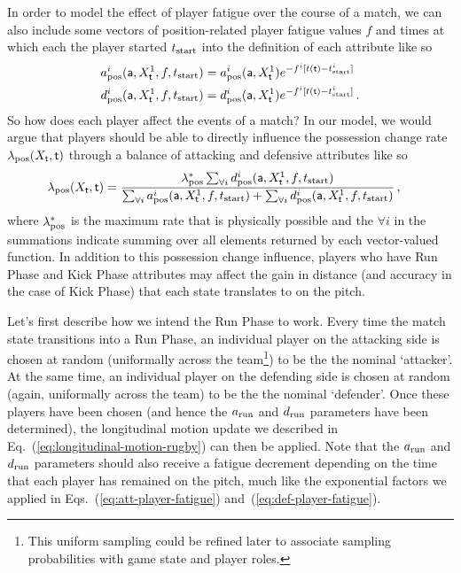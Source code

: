 In order to model the effect of player fatigue over the course of a match, we can also include some vectors of position-related player fatigue values $f$ and times at which each the player started $t_{\rm start}$ into the definition of each attribute like so
\begin{align}
a^i_{\rm pos}({\sf a}, X^1_{\sf t}, f, t_{\rm start}) &= a^i_{\rm pos}({\sf a}, X^1_{\sf t})e^{-f^i[t({\sf t})-t^i_{\rm start}]} \label{eq:att-player-fatigue} \\
d^i_{\rm pos}({\sf a}, X^1_{\sf t}, f, t_{\rm start}) &= d^i_{\rm pos}({\sf a}, X^1_{\sf t})e^{-f^i[t({\sf t})-t^i_{\rm start}]} \label{eq:def-player-fatigue} \,.
\end{align}
So how does each player affect the events of a match? In our model, we would argue that players should be able to directly influence the possession change rate $\lambda_{\rm pos}(X_{\sf t}, {\sf t})$ through a balance of attacking and defensive attributes like so
\begin{align}
\lambda_{\rm pos}(X_{\sf t}, {\sf t}) &= \frac{\lambda^*_{\rm pos}\sum_{\forall i}d^i_{\rm pos}({\sf a}, X^1_{\sf t}, f, t_{\rm start})}{\sum_{\forall i}a^i_{\rm pos}({\sf a}, X^1_{\sf t}, f, t_{\rm start}) + \sum_{\forall i}d^i_{\rm pos}({\sf a}, X^1_{\sf t}, f, t_{\rm start})}\,,
\end{align}
where $\lambda^*_{\rm pos}$ is the maximum rate that is physically possible and the $\forall i$ in the summations indicate summing over all elements returned by each vector-valued function. In addition to this possession change influence, players who have {\sf Run Phase} and {\sf Kick Phase} attributes may affect the gain in distance (and accuracy in the case of {\sf Kick Phase}) that each state translates to on the pitch. 

Let's first describe how we intend the {\sf Run Phase} to work. Every time the match state transitions into a {\sf Run Phase}, an individual player on the attacking side is chosen at random (uniformally across the team\footnote{This uniform sampling could be refined later to associate sampling probabilities with game state and player roles.}) to be the the nominal `attacker'. At the same time, an individual player on the defending side is chosen at random (again, uniformally across the team) to be the the nominal `defender'. Once these players have been chosen (and hence the $a_{\rm run}$ and $d_{\rm run}$ parameters have been determined), the longitudinal motion update we described in Eq.~(\ref{eq:longitudinal-motion-rugby}) can then be applied. Note that the $a_{\rm run}$ and $d_{\rm run}$ parameters should also receive a fatigue decrement depending on the time that each player has remained on the pitch, much like the exponential factors we applied in Eqs.~(\ref{eq:att-player-fatigue}) and~(\ref{eq:def-player-fatigue}).

